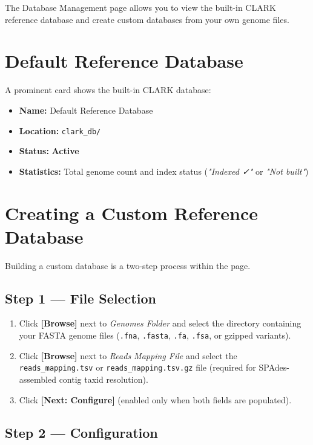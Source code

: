 \documentclass[12pt,a4paper]{report}
\newcommand{\btn}[1]{\textbf{\textcolor{primary}{[#1]}}}
\newcommand{\field}[1]{\textit{#1}}
\newcommand{\badge}[2]{\colorbox{#1!20}{\textcolor{#1!70!black}{\small\textbf{#2}}}}
\begin{document}
The Database Management page allows you to view the built-in CLARK reference database and create custom databases from your own genome files.

\section{Default Reference Database}

A prominent card shows the built-in CLARK database:
\begin{itemize}[leftmargin=1.5em]
  \item \textbf{Name:} Default Reference Database
  \item \textbf{Location:} \texttt{clark\_db/}
  \item \textbf{Status:} \badge{success}{Active}
  \item \textbf{Statistics:} Total genome count and index status (\textit{"Indexed \faCheck"} or \textit{"Not built"})
\end{itemize}

\section{Creating a Custom Reference Database}

Building a custom database is a two-step process within the page.

\subsection{Step 1 — File Selection}

\begin{enumerate}[leftmargin=1.5em]
  \item Click \btn{Browse} next to \field{Genomes Folder} and select the directory containing your FASTA genome files (\texttt{.fna}, \texttt{.fasta}, \texttt{.fa}, \texttt{.fsa}, or gzipped variants).
  \item Click \btn{Browse} next to \field{Reads Mapping File} and select the \texttt{reads\_mapping.tsv} or \texttt{reads\_mapping.tsv.gz} file (required for SPAdes-assembled contig taxid resolution).
  \item Click \btn{Next: Configure} (enabled only when both fields are populated).
\end{enumerate}

\subsection{Step 2 — Configuration}
\end{document}
